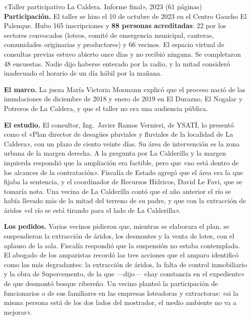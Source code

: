 \begin{ficha}{«Taller participativo La Caldera. Informe final», 2023 (61 páginas)}
\textbf{Participación.} El taller se hizo el 10 de octubre de 2023 en el Centro Gaucho El Palenque. Hubo 165 inscripciones y \textbf{88 personas acreditadas}: 22 por los sectores convocados (loteos, comité de emergencia municipal, canteras, comunidades originarias y productores) y 66 vecinos. El espacio virtual de consultas previas estuvo abierto once días y no recibió ninguna. Se completaron 48 encuestas. Nadie dijo haberse enterado por la radio, y la mitad consideró inadecuado el horario de un día hábil por la mañana.

\textbf{El marco.} La jueza María Victoria Mosmann explicó que el proceso nació de las inundaciones de diciembre de 2018 y enero de 2019 en El Durazno, El Nogalar y Potreros de La Caldera, y que el taller no era una audiencia pública.

\textbf{El estudio.} El consultor, Ing.\ Javier Ramos Vernieri, de YSATÍ, lo presentó como el «Plan director de desagües pluviales y fluviales de la localidad de La Caldera», con un plazo de ciento veinte días. Su área de intervención es la zona urbana de la margen derecha. A la pregunta por La Calderilla y la margen izquierda respondió que la ampliación era factible, pero que «no está dentro de los alcances de la contratación». Fiscalía de Estado agregó que el área era la que fijaba la sentencia, y el coordinador de Recursos Hídricos, David Le Favi, que se tomaría nota. Una vecina de La Calderilla contó que el año anterior el río se había llevado más de la mitad del terreno de su padre, y que con la extracción de áridos «el río se está tirando para el lado de La Calderilla».

\textbf{Los pedidos.} Varios vecinos pidieron que, mientras se elaborara el plan, se suspendieran la extracción de áridos, los desmontes y la venta de lotes, con el aplauso de la sala. Fiscalía respondió que la suspensión no estaba contemplada. El abogado de los amparistas recordó las tres acciones que el amparo identificó como las más degradantes: la extracción de áridos, la falta de control inmobiliario y la obra de Supercemento, de la que ---dijo--- «hay constancia en el expediente» de que desmontó bosque ribereño. Un vecino planteó la participación de funcionarios o de sus familiares en las empresas loteadoras y extractoras: «si la misma persona está de los dos lados del mostrador, el medio ambiente no va a mejorar».


\end{ficha}
